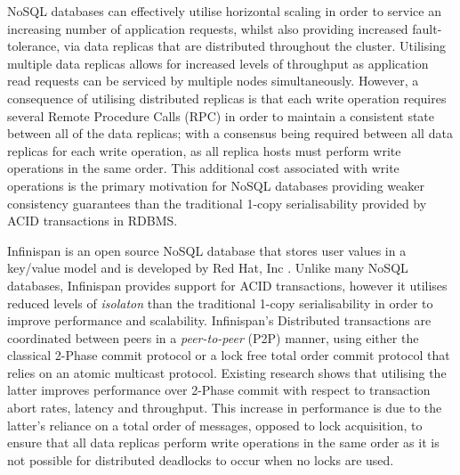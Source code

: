     NoSQL databases can effectively utilise horizontal scaling in order to service an increasing number of application requests, whilst also providing increased fault-tolerance, via data replicas that are distributed throughout the cluster.  Utilising multiple data replicas allows for increased levels of throughput as application read requests can be serviced by multiple nodes simultaneously.  However, a consequence of utilising distributed replicas is that each write operation requires several Remote Procedure Calls (RPC) in order to maintain a consistent state between all of the data replicas; with a consensus being required between all data replicas for each write operation, as all replica hosts must perform write operations in the same order.  This additional cost associated with write operations is the primary motivation for NoSQL databases providing weaker consistency guarantees than the traditional 1-copy serialisability provided by ACID transactions in RDBMS.  
            
    Infinispan \citep{Infinispan} is an open source NoSQL database that stores user values in a key/value model and is developed by Red Hat, Inc \citep{RedHat}.  Unlike many NoSQL databases, Infinispan provides support for ACID transactions, however it utilises reduced levels of \emph{isolaton} than the traditional 1-copy serialisability in order to improve performance and scalability.  Infinispan's Distributed transactions are coordinated between peers in a \emph{peer-to-peer} (P2P) manner, using either the classical 2-Phase commit protocol or a lock free total order commit protocol that relies on an atomic multicast protocol.  Existing research \citep{Ruivo:2011:ETO:2120967.2121604} shows that utilising the latter improves performance over 2-Phase commit with respect to transaction abort rates, latency and throughput.  This increase in performance is due to the latter's reliance on a total order of messages, opposed to lock acquisition, to ensure that all data replicas perform write operations in the same order as it is not possible for distributed deadlocks to occur when no locks are used.  
    
